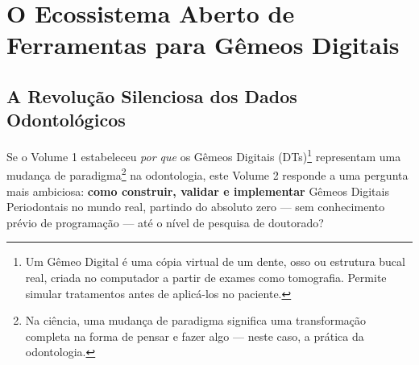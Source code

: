 
\section{O Ecossistema Aberto de Ferramentas para Gêmeos Digitais}

\subsection{A Revolução Silenciosa dos Dados Odontológicos}

Se o Volume 1 estabeleceu \textit{por que} os Gêmeos Digitais (DTs)\footnote[1]{Um Gêmeo Digital é uma cópia virtual de um dente, osso ou estrutura bucal real, criada no computador a partir de exames como tomografia. Permite simular tratamentos antes de aplicá-los no paciente.} representam uma mudança de paradigma\footnote[2]{Na ciência, uma mudança de paradigma significa uma transformação completa na forma de pensar e fazer algo — neste caso, a prática da odontologia.} na odontologia, este Volume 2 responde a uma pergunta mais ambiciosa: \textbf{como construir, validar e implementar} Gêmeos Digitais Periodontais no mundo real, partindo do absoluto zero — sem conhecimento prévio de programação — até o nível de pesquisa de doutorado?

